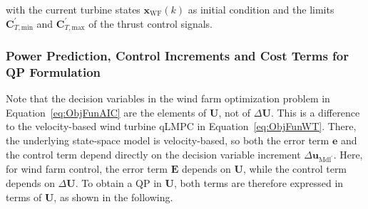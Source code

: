 with the current turbine states $\bm{x}_{\text{WF}}(k)$ as initial condition and the limits $\bm{C}_{T,\text{min}}^\prime$ and $\bm{C}_{T,\text{max}}^\prime$ of the thrust control signals.

\subsubsection{Power Prediction, Control Increments and Cost Terms for QP Formulation}
Note that the decision variables in the wind farm optimization problem in Equation~\eqref{eq:ObjFunAIC} are the elements of $\bm{U}$, not of $\Delta \bm{U}$. This is a difference to the velocity-based wind turbine qLMPC in Equation~\eqref{eq:ObjFunWT}. There, the underlying state-space model is velocity-based, so both the error term $\bm{e}$ and the control term depend directly on the decision variable increment $\Delta\bm{u}_{\text{Mdl}^\prime}$. Here, for wind farm control, the error term $\bm{E}$ depends on $\bm{U}$, while the control term depends on $\Delta\bm{U}$. To obtain a QP in $\bm{U}$, both terms are therefore expressed in terms of $\bm{U}$, as shown in the following.

